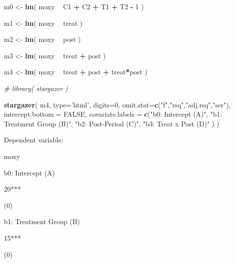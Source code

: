 \documentclass[]{book}
\newenvironment{Shaded}{\begin{snugshade}}{\end{snugshade}}
\newcommand{\CommentTok}[1]{\textcolor[rgb]{0.56,0.35,0.01}{\textit{#1}}}
\newcommand{\DataTypeTok}[1]{\textcolor[rgb]{0.13,0.29,0.53}{#1}}
\newcommand{\DecValTok}[1]{\textcolor[rgb]{0.00,0.00,0.81}{#1}}
\newcommand{\KeywordTok}[1]{\textcolor[rgb]{0.13,0.29,0.53}{\textbf{#1}}}
\newcommand{\NormalTok}[1]{#1}
\newcommand{\OperatorTok}[1]{\textcolor[rgb]{0.81,0.36,0.00}{\textbf{#1}}}
\newcommand{\OtherTok}[1]{\textcolor[rgb]{0.56,0.35,0.01}{#1}}
\newcommand{\StringTok}[1]{\textcolor[rgb]{0.31,0.60,0.02}{#1}}
\theoremstyle{definition}
\theoremstyle{definition}
\theoremstyle{definition}
\theoremstyle{remark}
\begin{document}
\begin{Shaded}
\begin{Highlighting}[]

\NormalTok{m0 <-}\StringTok{ }\KeywordTok{lm}\NormalTok{( moxy }\OperatorTok{~}\StringTok{ }\NormalTok{C1 }\OperatorTok{+}\StringTok{ }\NormalTok{C2 }\OperatorTok{+}\StringTok{ }\NormalTok{T1 }\OperatorTok{+}\StringTok{ }\NormalTok{T2 }\OperatorTok{-}\StringTok{ }\DecValTok{1}\NormalTok{ )}

\NormalTok{m1 <-}\StringTok{ }\KeywordTok{lm}\NormalTok{( moxy }\OperatorTok{~}\StringTok{ }\NormalTok{treat )}

\NormalTok{m2 <-}\StringTok{ }\KeywordTok{lm}\NormalTok{( moxy }\OperatorTok{~}\StringTok{ }\NormalTok{post )}

\NormalTok{m3 <-}\StringTok{ }\KeywordTok{lm}\NormalTok{( moxy }\OperatorTok{~}\StringTok{ }\NormalTok{treat }\OperatorTok{+}\StringTok{ }\NormalTok{post )}

\NormalTok{m4 <-}\StringTok{ }\KeywordTok{lm}\NormalTok{( moxy }\OperatorTok{~}\StringTok{ }\NormalTok{treat }\OperatorTok{+}\StringTok{ }\NormalTok{post }\OperatorTok{+}\StringTok{ }\NormalTok{treat}\OperatorTok{*}\NormalTok{post )}

\CommentTok{# library( stargazer )}

\KeywordTok{stargazer}\NormalTok{( m4, }\DataTypeTok{type=}\StringTok{'html'}\NormalTok{, }\DataTypeTok{digits=}\DecValTok{0}\NormalTok{,}
           \DataTypeTok{omit.stat=}\KeywordTok{c}\NormalTok{(}\StringTok{"f"}\NormalTok{,}\StringTok{"rsq"}\NormalTok{,}\StringTok{"adj.rsq"}\NormalTok{,}\StringTok{"ser"}\NormalTok{),}
           \DataTypeTok{intercept.bottom =} \OtherTok{FALSE}\NormalTok{,}
           \DataTypeTok{covariate.labels =} \KeywordTok{c}\NormalTok{(}\StringTok{"b0: Intercept (A)"}\NormalTok{, }\StringTok{"b1: Treatment Group (B)"}\NormalTok{,}
                                \StringTok{"b2: Post-Period (C)"}\NormalTok{, }\StringTok{"b3: Treat x Post (D)"}\NormalTok{ ) )}
\end{Highlighting}
\end{Shaded}

Dependent variable:

moxy

b0: Intercept (A)

20***

(0)

b1: Treatment Group (B)

15***

(0)
\end{document}
